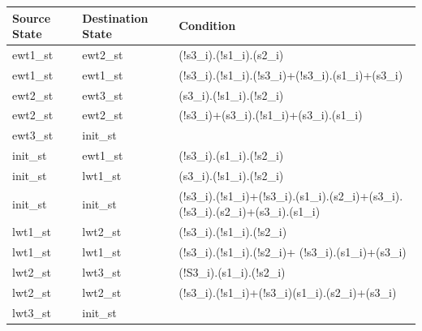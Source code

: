 \documentclass[12pt,a4 paper] {report}
\begin{document}
\begin{center}
	\begin{tabular}{| p{2cm} | p{2cm} | p{11cm} |}
		\hline
		Source State& Destination State & Condition \\
		\hline
		ewt1\_st & ewt2\_st & (!s3\_i).(!s1\_i).(s2\_i) \\
		\hline
		ewt1\_st & ewt1\_st  & (!s3\_i).(!s1\_i).(!s3\_i)+(!s3\_i).(s1\_i)+(s3\_i) \\
		\hline
		ewt2\_st & ewt3\_st & (s3\_i).(!s1\_i).(!s2\_i)\\
		\hline
		ewt2\_st & ewt2\_st & (!s3\_i)+(s3\_i).(!s1\_i)+(s3\_i).(s1\_i)\\
		\hline
		ewt3\_st & init\_st & \\
		\hline
		init\_st & ewt1\_st & (!s3\_i).(s1\_i).(!s2\_i)\\
		\hline
		init\_st & lwt1\_st & (s3\_i).(!s1\_i).(!s2\_i)\\
		\hline
		init\_st & init\_st & (!s3\_i).(!s1\_i)+(!s3\_i).(s1\_i).(s2\_i)+(s3\_i).(!s3\_i).(s2\_i)+(s3\_i).(s1\_i)\\
		\hline	
		lwt1\_st & lwt2\_st & (!s3\_i).(!s1\_i).(!s2\_i)\\
		\hline	
		lwt1\_st & lwt1\_st & (!s3\_i).(!s1\_i).(!s2\_i)+ (!s3\_i).(s1\_i)+(s3\_i)\\
		\hline
		lwt2\_st & lwt3\_st & (!S3\_i).(s1\_i).(!s2\_i) \\
		\hline
		lwt2\_st & lwt2\_st & (!s3\_i).(!s1\_i)+(!s3\_i)(s1\_i).(s2\_i)+(s3\_i) \\
		\hline
		lwt3\_st & init\_st  & \\
		\hline	
	\end{tabular}
\end{center}

\newpage
\end{document}
